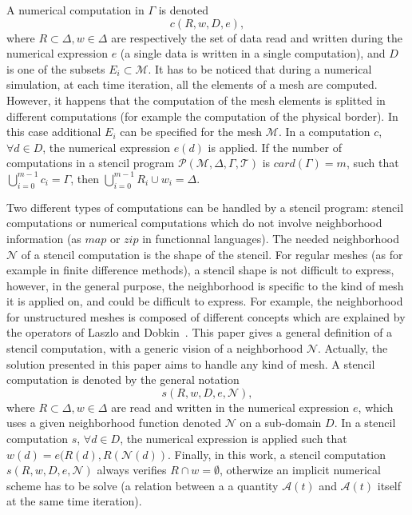 A numerical computation in $\Gamma$ is denoted 
\begin{equation}
c(R,w,D,e), 
\end{equation}
where $R \subset \Delta, w \in \Delta$ are respectively the set of data read and written during the numerical expression $e$ (a single data is written in a single computation), and $D$ is one of the subsets $E_i \subset \mathcal{M}$. It has to be noticed that during a numerical simulation, at each time iteration, all the elements of a mesh are computed. However, it happens that the computation of the mesh elements is splitted in different computations (for example the computation of the physical border). In this case additional $E_i$ can be specified for the mesh $\mathcal{M}$. %
In a computation $c$, $\forall d \in D$, the numerical expression $e(d)$ is applied. If the number of computations in a stencil program $\mathcal{P}(\mathcal{M},\Delta,\Gamma,\mathcal{T})$ is $card(\Gamma)=m$, such that $\bigcup_{i=0}^{m-1}c_i = \Gamma$, then $\bigcup_{i=0}^{m-1}R_i \cup w_i = \Delta$. %

Two different types of computations can be handled by a stencil program: stencil computations or numerical computations which do not involve neighborhood information (as $map$ or $zip$ in functionnal languages). The needed neighborhood $\mathcal{N}$ of a stencil computation is the shape of the stencil. For regular meshes (as for example in finite difference methods), a stencil shape is not difficult to express, however, in the general purpose, the neighborhood is specific to the kind of mesh it is applied on, and could be difficult to express. For example, the neighborhood for unstructured meshes is composed of different concepts which are explained by the operators of Laszlo and Dobkin~\cite{}. This paper gives a general definition of a stencil computation, with a generic vision of a neighborhood $\mathcal{N}$. %
Actually, the solution presented in this paper aims to handle any kind of mesh. A stencil computation is denoted by the general notation
\begin{equation}
s(R,w,D,e,\mathcal{N}),
\end{equation}
where $R \subset \Delta, w \in \Delta$ are read and written in the numerical expression $e$, which uses a given neighborhood function denoted $\mathcal{N}$ on a sub-domain $D$. In a stencil computation $s$, $\forall d \in D$, the numerical expression is applied such that $w(d) = e(R(d),R(\mathcal{N}(d))$. Finally, in this work, a stencil computation $s(R,w,D,e,\mathcal{N})$ always verifies $R \cap w = \emptyset$, otherwize an implicit numerical scheme has to be solve (a relation between a a quantity $\mathcal{A}(t)$ and $\mathcal{A}(t)$ itself at the same time iteration).

